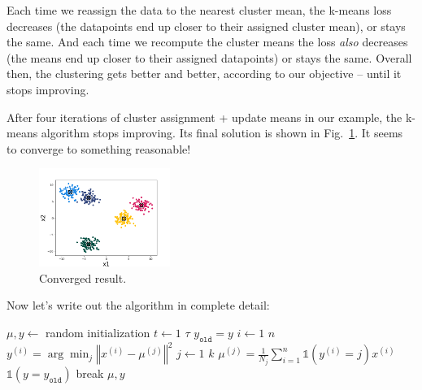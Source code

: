 Each time we reassign the data to the nearest cluster mean, the
k-means loss decreases (the datapoints end up closer to their assigned
cluster mean), or stays the same.  And each time we recompute the
cluster means the loss \textit{also} decreases (the means end up
closer to their assigned datapoints) or stays the same. Overall then,
the clustering gets better and better, according to our objective --
until it stops improving.

After four iterations of cluster assignment + update means in our example,
the k-means algorithm stops improving. Its final solution is shown in Fig.~\ref{fig:kmeans_converged}. It seems to converge to something reasonable!
\begin{figure}[!h]
  \centering
  \includegraphics[width=0.38\textwidth]{figures/kmeans_fig2_converged.png}
  \caption{Converged result.}
  \label{fig:kmeans_converged}
\end{figure}

Now let's write out the algorithm in complete detail:


\begin{codebox}
  \li $\mu, y \gets $ random initialization
  \li \For $t \gets 1$ \To $\tau$
  \li   \Do
  $y_{\texttt{old}} = y$
  \li        \For $i \gets 1$ \To $n$
  \li       \Do
  $y^{(i)} = \arg\min_j \left\Vert x^{(i)} - \mu^{(j)} \right\Vert^2$
  \End
  \li    \For $j \gets 1$ \To $k$
  \li       \Do
  $\mu^{(j)} = \frac{1}{N_j} \sum_{i=1}^n \mathbb{1}(y^{(i)} = j) x^{(i)}$
  \End
  \li      \If $\mathbb{1}(y = y_{\texttt{old}})$
  \li          \Then
  break \label{alg:termination}
  \End
  \End
  \li \Return $\mu, y$
\end{codebox}

